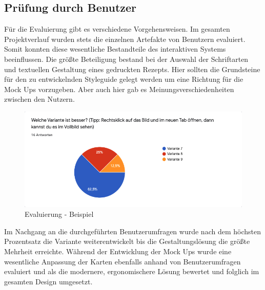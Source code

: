 \subsection{Prüfung durch Benutzer}
Für die Evaluierung gibt es verschiedene Vorgehensweisen. Im gesamten Projektverlauf wurden stets die einzelnen Artefakte von Benutzern evaluiert. Somit konnten diese wesentliche Bestandteile des interaktiven Systems beeinflussen. Die größte Beteiligung bestand bei der Auswahl der Schriftarten und textuellen Gestaltung eines gedruckten Rezepts. Hier sollten die Grundsteine für den zu entwickelnden Styleguide gelegt werden um eine Richtung für die Mock Ups vorzugeben. Aber auch hier gab es Meinungsverschiedenheiten zwischen den Nutzern. \\
\begin{figure}[h] %
    \includegraphics[width=1\textwidth]{images/EvaluierungBeispiel.png}
    \caption[Evaluierung - Beispiel]{Evaluierung - Beispiel}
    \label{fig:EvaluierungBeispiel}
\end{figure}
Im Nachgang an die durchgeführten Benutzerumfragen wurde nach dem höchsten Prozentsatz die Variante weiterentwickelt bis die Gestaltungslösung die größte Mehrheit erreichte. Während der Entwicklung der Mock Ups wurde eine wesentliche Anpassung der Karten ebenfalls anhand von Benutzerumfragen evaluiert und als die modernere, ergonomischere Lösung bewertet und folglich im gesamten Design umgesetzt. 

